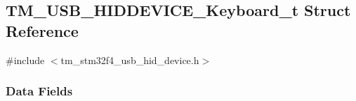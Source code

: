 \hypertarget{struct_t_m___u_s_b___h_i_d_d_e_v_i_c_e___keyboard__t}{}\subsection{T\+M\+\_\+\+U\+S\+B\+\_\+\+H\+I\+D\+D\+E\+V\+I\+C\+E\+\_\+\+Keyboard\+\_\+t Struct Reference}
\label{struct_t_m___u_s_b___h_i_d_d_e_v_i_c_e___keyboard__t}


{\ttfamily \#include $<$tm\+\_\+stm32f4\+\_\+usb\+\_\+hid\+\_\+device.\+h$>$}

\subsubsection*{Data Fields}
